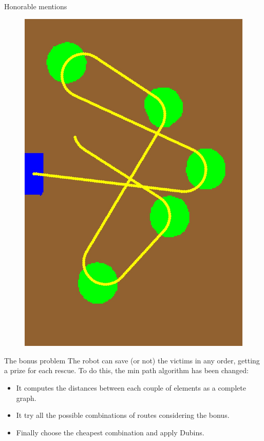 \begin{frame}{Honorable mentions}
\begin{figure}[H]
\begin{minipage}{0.45\linewidth}
		\includegraphics[scale=0.13]{Immagini/map7}
	\end{minipage}
\end{figure}
\end{frame}

\begin{frame}{The bonus problem}
The robot can save (or not) the victims in any order, getting a prize for each rescue. \newline
To do this, the min path algorithm has been changed:
\begin{itemize}
	\item It computes the distances between each couple of elements as a complete graph.
	\item It try all the possible combinations of routes considering the bonus.
	\item Finally choose the cheapest combination and apply Dubins. 
\end{itemize}
\end{frame}

